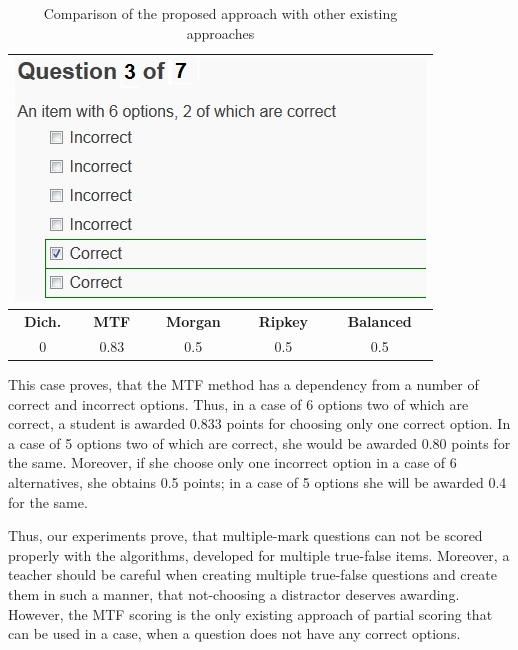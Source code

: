 \begin{table}[h!]
	\centering
	\begin{tabularx}{0.5\columnwidth}{c c c c c} 
	\toprule  
    \multicolumn{5}{c}{\includegraphics[width=0.5\columnwidth]{images/case3.jpg}}\\
    \midrule
    \textbf{Dich.}&\textbf{MTF}&\textbf{Morgan}&\textbf{Ripkey}&\textbf{Balanced}\\
	\midrule
    0&0.83&0.5&0.5&0.5\\
	\bottomrule
    \end{tabularx}
	\caption{Comparison of the proposed approach with other existing approaches}
	\label{tab:case 3}
\end{table}

\begin{example}
This case proves, that the MTF method has a dependency from a number of correct and incorrect options. 
Thus, in a case of 6 options two of which are correct, a student is awarded 0.833 points for choosing only one correct option.
In a case of 5 options two of which are correct, she would be awarded 0.80 points for the same.
Moreover, if she choose only one incorrect option in a case of 6 alternatives, she obtains 0.5 points; in a case of 5 options she will be awarded 0.4 for the same.
\end{example}

Thus, our experiments prove, that multiple-mark questions can not be scored properly with the algorithms, developed for multiple true-false items.
Moreover, a teacher should be careful when creating multiple true-false questions and create them in such a manner, that not-choosing a distractor deserves awarding.
However, the MTF scoring is the only existing approach of partial scoring that can be used in a case, when a question does not have any correct options.

